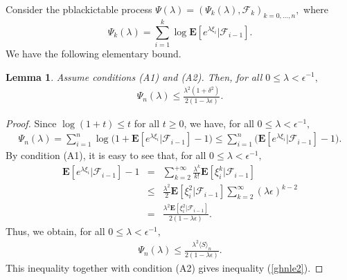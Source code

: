 \documentclass{gSTA2e}
\theoremstyle{plain}
\newtheorem{lemma}[theorem]{Lemma}
\theoremstyle{definition}
\theoremstyle{remark}
\begin{document}
Consider the pblackictable process $\Psi (\lambda )=(\Psi
_k(\lambda ),\mathcal{F}_k)_{k=0,...,n},$ where
\begin{equation}
\Psi _k(\lambda )=\sum_{i=1}^k\log \mathbf{E}[e^{\lambda \xi _i}|\mathcal{F}_{i-1}].
\label{C-3}
\end{equation}
We have the following elementary bound.
\begin{lemma}
\label{lemma2} Assume conditions (A1) and (A2).  Then, for all $0 \leq \lambda < \epsilon^{-1} ,$
\begin{eqnarray} \label{ghnle2}
\Psi _n(\lambda )  \leq    \frac{\lambda^2(1+\delta^2)}{2 (1-\lambda\epsilon)}.
\end{eqnarray}
\end{lemma}
\begin{proof}  Since $\log (1+t) \leq t$ for all $t\geq 0$,  we have, for all $0 \leq \lambda < \epsilon^{-1} ,$
\begin{eqnarray*}
\Psi _n(\lambda )  = \sum_{i=1}^{n} \log \Big(1+ \mathbf{E}[e^{\lambda \xi _i}|\mathcal{F}_{i-1}]-1  \Big)
 \leq \sum_{i=1}^{n}  \Big(  \mathbf{E}[e^{\lambda \xi _i}|\mathcal{F}_{i-1}]-1  \Big).
\end{eqnarray*}
By condition (A1), it is easy to see that, for all $0 \leq \lambda < \epsilon^{-1} ,$
\begin{eqnarray*}
 \mathbf{E}[e^{\lambda \xi _i}|\mathcal{F}_{i-1}]-1 &=& \sum_{k=2}^{+\infty}\frac{\lambda^{k}}{k !} \mathbf{E}[\xi_{i}^{k} |\mathcal{F}_{i-1}]  \nonumber\\
&\leq & \frac{\lambda^2}{2}\mathbf{E}[\xi_{i}^{2} |\mathcal{F}_{i-1}]\sum_{k=2}^{\infty}(\lambda\epsilon)^{k-2}  \nonumber\\
 &= &\frac{\lambda^2\mathbf{E}[\xi_{i}^{2} |\mathcal{F}_{i-1}]}{2(1-\lambda\epsilon)}.\nonumber
\end{eqnarray*}
Thus, we obtain, for all $0 \leq \lambda < \epsilon^{-1} ,$
\begin{eqnarray}
\Psi _n(\lambda )   \leq   \frac{\lambda^2\langle S\rangle_n}{2 (1-\lambda\epsilon)}.\nonumber
\end{eqnarray}
This inequality together with condition (A2) gives inequality (\ref{ghnle2}).
\end{proof}
\end{document}
